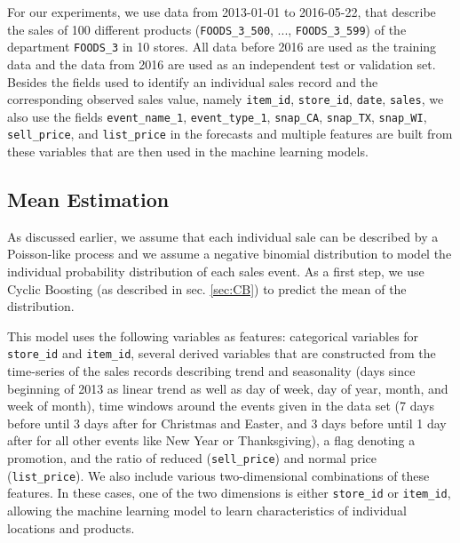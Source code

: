 \documentclass[BCOR=1mm, DIV=calc,10pt,
twoside=true,
twocolumn,
headings=normal]{scrartcl}
\begin{document}
For our experiments, we use data from 2013-01-01 to 2016-05-22, that describe the sales of 100 different products (\texttt{FOODS\_3\_500}, ..., \texttt{FOODS\_3\_599}) of the department \texttt{FOODS\_3} in 10 stores.  All data before 2016 are used as the training data and the data from 2016 are used as an independent test or validation set. Besides the fields used to identify an individual sales record and the corresponding observed sales value, namely \texttt{item\_id}, \texttt{store\_id}, \texttt{date}, \texttt{sales}, we also use the fields \texttt{event\_name\_1}, \texttt{event\_type\_1}, \texttt{snap\_CA}, \texttt{snap\_TX}, \texttt{snap\_WI}, \texttt{sell\_price}, and \texttt{list\_price} in the forecasts and multiple features are built from these variables that are then used in the machine learning models.

\subsection{Mean Estimation}
\label{sec:example_mean}

As discussed earlier, we assume that each individual sale can be described by a Poisson-like process and we assume a negative binomial distribution to model the individual probability distribution of each sales event. As a first step, we use Cyclic Boosting (as described in sec. \ref{sec:CB}) to predict the mean of the distribution.

\noindent
This model uses the following variables as features: categorical variables for \texttt{store\_id} and \texttt{item\_id}, several derived variables that are constructed from the time-series of the sales records describing trend and seasonality (days since beginning of 2013 as linear trend as well as day of week, day of year, month, and week of month), time windows around the events given in the data set (7 days before until 3 days after for Christmas and Easter, and 3 days before until 1 day after for all other events like New Year or Thanksgiving), a flag denoting a promotion, and the ratio of reduced (\texttt{sell\_price}) and normal price (\texttt{list\_price}). We also include various two-dimensional combinations of these features. In these cases, one of the two dimensions is either \texttt{store\_id} or \texttt{item\_id}, allowing the machine learning model to learn characteristics of individual locations and products.
\end{document}
